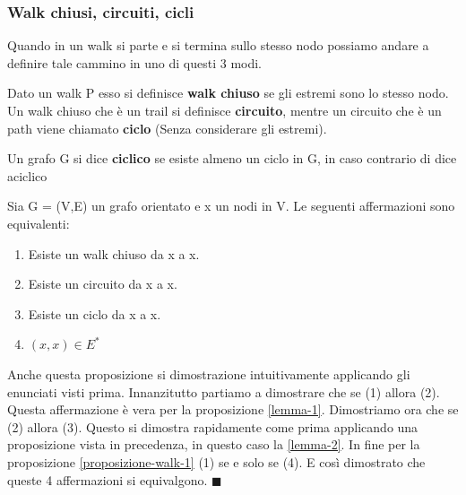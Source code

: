 \subsubsection{Walk chiusi, circuiti, cicli}
Quando in un walk si parte e si termina sullo stesso nodo possiamo andare a definire tale cammino in uno di questi 3 modi.
\begin{definition}\label{walk-chiusi-circuiti-cicli}
    Dato un walk P esso si definisce \textbf{walk chiuso} se gli estremi sono lo stesso nodo. Un walk chiuso che è un trail si definisce \textbf{circuito}, mentre un circuito che è un path viene chiamato \textbf{ciclo} (Senza considerare gli estremi).
\end{definition}
\begin{definition}
    Un grafo G si dice \textbf{ciclico} se esiste almeno un ciclo in G, in caso contrario di dice aciclico
\end{definition}

\newpage
\begin{proposition}\label{proposizione-walk-2}
    Sia G = (V,E) un grafo orientato e x un nodi in V. Le seguenti affermazioni sono equivalenti:
    \begin{enumerate}
        \item Esiste un walk chiuso da x a x.
        \item Esiste un circuito da x a x.
        \item Esiste un ciclo da x a x.
        \item $(x,x) \in E^*$
    \end{enumerate}
\end{proposition}
\begin{demostration}
Anche questa proposizione si dimostrazione intuitivamente applicando gli enunciati visti prima. Innanzitutto partiamo a dimostrare che se (1) allora (2). Questa affermazione è vera per la proposizione \ref{lemma-1}. Dimostriamo ora che se (2) allora (3). Questo si dimostra rapidamente come prima applicando una proposizione vista in precedenza, in questo caso la \ref{lemma-2}. In fine per la proposizione \ref{proposizione-walk-1} (1) se e solo se (4). E così dimostrato che queste 4 affermazioni si equivalgono. $\blacksquare$
\end{demostration}


